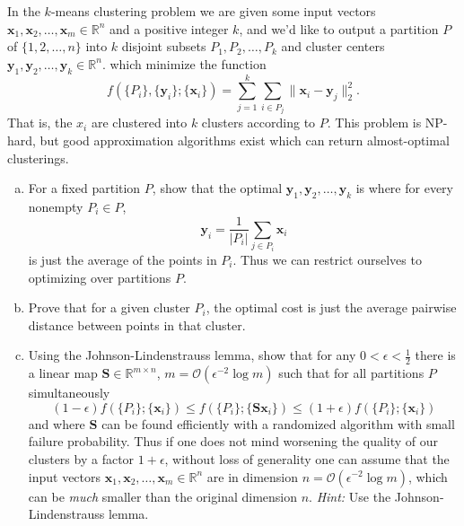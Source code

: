 \documentclass[12pt,letterpaper,cm]{hmcpset}
\newcommand\x{\boldsymbol{x}}
\newcommand\y{\boldsymbol{y}}
\renewcommand\S{\boldsymbol{S}}
\begin{document}
\begin{problem}
    In the $k$-means clustering problem we are given some input vectors
    $\x_1,\x_2,\ldots,\x_m\in\mathbb{R}^n$ and a positive integer $k$,
    and we'd like to output a partition $P$ of $\{1,2,\ldots,n\}$ into $k$
    disjoint subsets $P_1,P_2,\ldots,P_k$ and cluster centers $\y_1,\y_2,\ldots,\y_k\in\mathbb{R}^n$.
    which minimize the function
    \[
        f(\{P_i\},\{\y_i\};\{\x_i\}) = \sum_{j=1}^k \sum_{i\in P_j} \bigl\| \x_i - \y_j \bigr\|_2^2.
    \]
    That is, the $x_i$ are clustered into $k$ clusters according to $P$. This problem is NP-hard,
    but good approximation algorithms exist which can return almost-optimal clusterings.
\begin{enumerate}[(a)]
    \item For a fixed partition $P$, show that the optimal $\y_1,\y_2,\ldots,\y_k$ is where
        for every nonempty $P_i\in P$, $$\y_i = \frac{1}{|P_i|}\sum_{j\in P_i} \x_i$$ is just
        the average of the points in $P_i$. Thus we can restrict ourselves to optimizing over
        partitions $P$.
    \item Prove that for a given cluster $P_i$, the optimal cost is just the average pairwise distance
        between points in that cluster.
    \item Using the Johnson-Lindenstrauss lemma, show that for any $0 < \epsilon < \tfrac{1}{2}$
        there is a linear map $\S\in\mathbb{R}^{m\times n}$, $m = \mathcal{O}(\epsilon^{-2}\log m)$
        such that for all partitions $P$ simultaneously
        \[
            (1-\epsilon)f(\{P_i\};\{\x_i\}) \leq f(\{P_i\};\{\S\x_i\}) \leq (1+\epsilon)f(\{P_i\};\{\x_i\})
        \]
        and where $\S$ can be found efficiently with a randomized algorithm with small failure probability.
        Thus if one does not mind worsening the quality of our clusters by a factor $1+\epsilon$, without
        loss of generality one can assume that the input vectors $\x_1,\x_2,\ldots,\x_m\in\mathbb{R}^n$
        are in dimension $n = \mathcal{O}(\epsilon^{-2} \log m)$, which can be \emph{much} smaller than the
        original dimension $n$. \textit{Hint:} Use the Johnson-Lindenstrauss lemma.
\end{enumerate}
\end{problem}

\begin{solution}
    \vfill
\end{solution}
\end{document}

